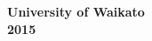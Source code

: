 \begin{titlepage}
\begin{center}
\textbf{University of Waikato}\\
\textbf{ \medskip{}
2015}
\par\end{center}

\end{titlepage}

